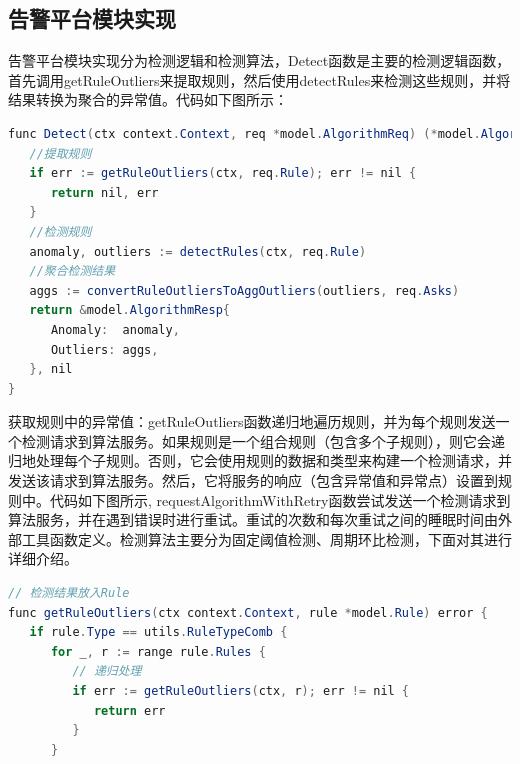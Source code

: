 \begin{longtable}[htbp]
\section{告警平台模块实现}

告警平台模块实现分为检测逻辑和检测算法，Detect函数是主要的检测逻辑函数，首先调用getRuleOutliers来提取规则，然后使用detectRules来检测这些规则，并将结果转换为聚合的异常值。代码如下图所示：

\begin{lrbox}{\gaojingpingtaijianceluoji}  
\begin{lstlisting}[language=Java]  
func Detect(ctx context.Context, req *model.AlgorithmReq) (*model.AlgorithmResp, error) {
   //提取规则
   if err := getRuleOutliers(ctx, req.Rule); err != nil {
      return nil, err
   }
   //检测规则
   anomaly, outliers := detectRules(ctx, req.Rule)
   //聚合检测结果
   aggs := convertRuleOutliersToAggOutliers(outliers, req.Asks)
   return &model.AlgorithmResp{
      Anomaly:  anomaly,
      Outliers: aggs,
   }, nil
}
\end{lstlisting}  
\end{lrbox} 
\setlength{\belowcaptionskip}{-20pt} %
\begin{table}[h]   
\caption{告警平台检测逻辑}  
\label{tab:gaojingpingtaijianceluoji}  
\usebox{\gaojingpingtaijianceluoji}  
\end{table} 

获取规则中的异常值：getRuleOutliers函数递归地遍历规则，并为每个规则发送一个检测请求到算法服务。如果规则是一个组合规则（包含多个子规则），则它会递归地处理每个子规则。否则，它会使用规则的数据和类型来构建一个检测请求，并发送该请求到算法服务。然后，它将服务的响应（包含异常值和异常点）设置到规则中。代码如下图所示,
requestAlgorithmWithRetry函数\cite{王叶群2012一种时效性约束的二进制指数退避算法}尝试发送一个检测请求到算法服务，并在遇到错误时进行重试。重试的次数和每次重试之间的睡眠时间由外部工具函数定义。检测算法主要分为固定阈值检测、周期环比检测，下面对其进行详细介绍。
\begin{lrbox}{\getRuleErrorOne}  
\begin{lstlisting}[language=Java]  
// 检测结果放入Rule
func getRuleOutliers(ctx context.Context, rule *model.Rule) error {
   if rule.Type == utils.RuleTypeComb {
      for _, r := range rule.Rules {
         // 递归处理
         if err := getRuleOutliers(ctx, r); err != nil {
            return err
         }
      }


\end{lstlisting}  
\end{lrbox} 
\begin{table}[h]   
\caption{获取规则中的异常值}  
\label{tab:getRuleErrorOne}  
\usebox{\getRuleErrorOne}  
\end{table} 


\end{longtable}
